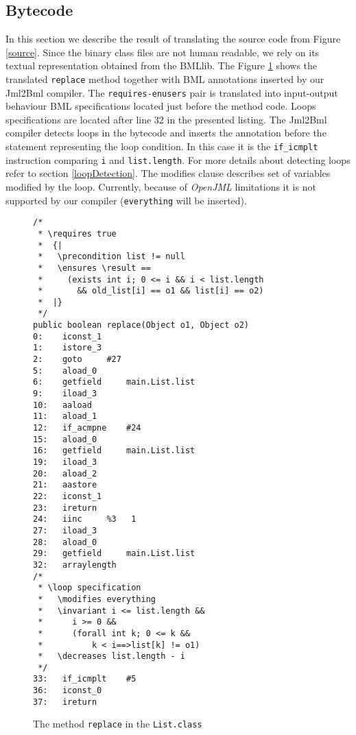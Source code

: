 \documentclass{acm_proc_article-sp}
\begin{document}
\subsection{Bytecode}
In this section we describe the result of translating the source code from Figure \ref{source}. Since the binary class files are not human readable, we rely on its textual representation obtained from the BMLlib. The Figure \ref{bytecode} shows the translated \texttt{replace} method together with BML annotations inserted by our Jml2Bml compiler. The \texttt{requires-enusers} pair is translated into input-output behaviour BML specifications located just before the method code. Loops specifications are located after line 32 in the presented listing. The Jml2Bml compiler detects loops in the bytecode and inserts the annotation before the statement representing the loop condition. In this case it is the \texttt{if\_icmplt} instruction comparing \texttt{i} and \texttt{list.length}. For more details about detecting loops refer to section \ref{loopDetection}. The modifies clause describes set of variables modified by the loop. Currently, because of \textit{OpenJML} limitations it is not supported by our compiler (\texttt{everything} will be inserted).
\begin{figure}
\lstset{basicstyle=\small}

\begin{lstlisting}
/*
 * \requires true
 *  {|
 *   \precondition list != null
 *   \ensures \result ==
 *     (exists int i; 0 <= i && i < list.length
 *       && old_list[i] == o1 && list[i] == o2)
 *  |}
 */
public boolean replace(Object o1, Object o2)
0:    iconst_1
1:    istore_3
2:    goto	   #27
5:    aload_0
6:    getfield	   main.List.list
9:    iload_3
10:   aaload
11:   aload_1
12:   if_acmpne	   #24
15:   aload_0
16:   getfield	   main.List.list
19:   iload_3
20:   aload_2
21:   aastore
22:   iconst_1
23:   ireturn
24:   iinc	   %3	1
27:   iload_3
28:   aload_0
29:   getfield	   main.List.list
32:   arraylength
/*
 * \loop specification
 *   \modifies everything
 *   \invariant i <= list.length &&
 *      i >= 0 &&
 *      (forall int k; 0 <= k &&
 *          k < i==>list[k] != o1)
 *   \decreases list.length - i
 */
33:   if_icmplt	   #5
36:   iconst_0
37:   ireturn

\end{lstlisting}
\label{bytecode}
\caption{The method \texttt{replace} in the \texttt{List.class}}
\end{figure}
\end{document}
